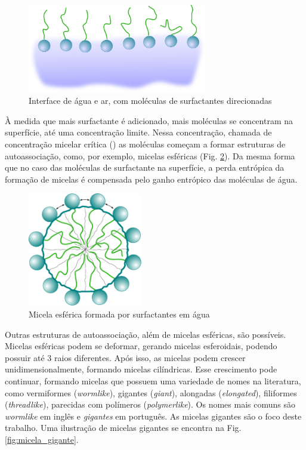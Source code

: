 	\begin{figure}[h]
		\centering
		\includegraphics[width=0.7\textwidth]{./imagens/introducao/superficie_surfactante}
		\caption{Interface de água e ar, com moléculas de surfactantes direcionadas}
		\label{fig:superficie_surfactante}
	\end{figure} 
	
	À medida que mais surfactante é adicionado, mais moléculas se concentram na superfície, até uma concentração limite. Nessa concentração, chamada de concentração micelar crítica (\cmc)  as moléculas começam a formar estruturas de autoassociação, como, por exemplo, micelas esféricas (Fig. \ref{fig:micela_esferica}). Da mesma forma que no caso das moléculas de surfactante na superfície, a perda entrópica da formação de micelas é compensada pelo ganho entrópico das moléculas de água. 
	
	\begin{figure}[h]
		\centering
		\includegraphics[width=5cm]{./imagens/introducao/micela_esferica}
		\caption{Micela esférica formada por surfactantes em água}
		\label{fig:micela_esferica}
	\end{figure}
	
	Outras estruturas de autoassociação, além de micelas esféricas, são possíveis. Micelas esféricas podem se deformar, gerando micelas esferoidais, podendo possuir até 3 raios diferentes. Após isso, as micelas podem crescer unidimensionalmente, formando micelas cilíndricas. Esse crescimento pode continuar, formando micelas que possuem uma variedade de nomes na literatura, como vermiformes (\emph{wormlike}), gigantes (\emph{giant}), alongadas (\emph{elongated}), filiformes (\emph{threadlike}), parecidas com polímeros (\emph{polymerlike}). Os nomes mais comuns são \emph{wormlike} em inglês e \emph{gigantes} em português. As micelas gigantes são o foco deste trabalho. Uma ilustração de micelas gigantes se encontra na Fig. \ref{fig:micela_gigante}. 
	
